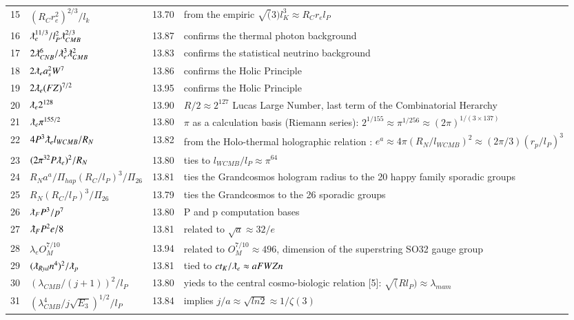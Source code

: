 \documentclass[a4paper,9pt]{article}
\begin{document}
\begin{table}
\begin{tabular}{llll}
    15 &  $(R_{C}r_e^2)^{2/3}/l_k$ & 13.70 & from the empiric $\sqrt(3) l_K^3  \approx R_{C}r_el_P$ \\
    16 & $\lambdabar_{e} ^{11/3}/l_P^2 \lambdabar_{CMB}^{2/3}$ & 13.87 & confirms the thermal photon background\\
    17 & $2\lambdabar_{CNB}^6/\lambdabar_e ^3 \lambdabar_{CMB}^2$ & 13.83 & confirms the statistical neutrino background\\
    18 & $2\lambdabar_{e} a_s^2 W^7$ & 13.86 & confirms the Holic Principle \\
    19 & $2\lambdabar_{e} (FZ)^{7/2}$ & 13.95 & confirms the Holic Principle \\
    20 & $\lambdabar_{e} 2^{128}$ & 13.90 & $R/2 \approx 2^{127}$ Lucas Large Number, last term of the Combinatorial Herarchy\\
    21 & $\lambdabar_{e} \pi^{155/2}$ & 13.80 & $\pi$ as a calculation basis (Riemann series): $2^{1/155} \approx \pi^{1/256} \approx (2\pi)^{1/(3\times 137)}$ \\
    22 & $4P^3\lambdabar_{e} l_{WCMB} /R_N$ & 13.82 & from the Holo-thermal holographic relation : $e^a \approx 4\pi (R_N/l_{WCMB} )^2 \approx (2\pi /3) (r_p/l_P)^3$  \\
    23 & $(2\pi^{32}P\lambdabar_{e})^2 /R_N$ & 13.80 & ties to $l_{WCMB}/l_P \approx \pi^{64}$\\        
    24 & $R_N a^a/\Pi_{hap} (R_{C}/l_P)^3/\Pi_{26}$ & 13.81 & ties the Grandcosmos hologram radius to the 20 happy family sporadic groups\\  
    25 & $R_N (R_{C}/l_P)^3/\Pi_{26}$ & 13.79 & ties the Grandcosmos to the 26 sporadic groups\\   
    26 & $\lambdabar_{F} P^3 /p^7$ & 13.80 & P and p computation bases\\      
    27 & $\lambdabar_{F} P^2 e/8$ & 13.81 &  related to $\sqrt a  \approx 32/e$ \\     
    28 &  $\lambda_{e} O_M^{7/10}$ & 13.94 &  related to $O_M^{7/10} \approx 496$, dimension of the superstring SO32 gauge group  \\
    29 & $(\lambdabar_{Ryd} n^{4})^2/\lambdabar_p$ & 13.81 & tied to $ct_K/\lambdabar_e \approx aFWZn$ \\ 
    30 & $(\lambda_{CMB}/(j+1))^2/l_P$ & 13.80 & yieds to the central cosmo-biologic relation [5]: $\sqrt(Rl_P) \approx \lambda_{mam}$ \\
    31 & $(\lambda_{CMB}^4/j\sqrt{E_3})^{1/2}/l_P$ & 13.84 & implies $j/a \approx \sqrt{ln2} \approx 1/\zeta(3)$\\ 

\end{tabular}
\end{table}
\end{document}
